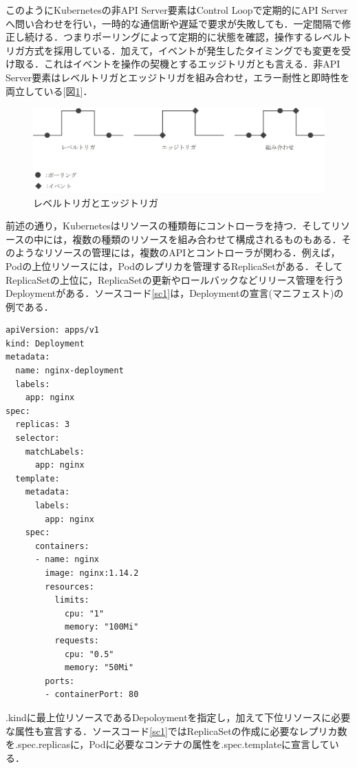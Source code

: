 \documentclass[12pt,a4j]{ujreport}
\begin{document}
このようにKubernetesの非API Server要素はControl Loopで定期的にAPI Serverへ問い合わせを行い，一時的な通信断や遅延で要求が失敗しても．一定間隔で修正し続ける．つまりポーリングによって定期的に状態を確認，操作するレベルトリガ方式を採用している．加えて，イベントが発生したタイミングでも変更を受け取る．これはイベントを操作の契機とするエッジトリガとも言える．非API Server要素はレベルトリガとエッジトリガを組み合わせ，エラー耐性と即時性を両立している[図\ref{fig5}]．

\begin{figure}[b]
    \centerline{\includegraphics[clip,width=140mm]{images/trigger.jpg}}
    \caption{レベルトリガとエッジトリガ}\label{fig5}
\end{figure}

前述の通り，Kubernetesはリソースの種類毎にコントローラを持つ．そしてリソースの中には，複数の種類のリソースを組み合わせて構成されるものもある．そのようなリソースの管理には，複数のAPIとコントローラが関わる．例えば，Podの上位リソースには，Podのレプリカを管理するReplicaSetがある．そしてReplicaSetの上位に，ReplicaSetの更新やロールバックなどリリース管理を行うDeploymentがある．ソースコード\ref{sc1}は，Deploymentの宣言(マニフェスト)の例である．

\newpage
\begin{lstlisting}[caption=Deploymentの宣言例,label=sc1]
apiVersion: apps/v1
kind: Deployment
metadata:
  name: nginx-deployment
  labels:
    app: nginx
spec:
  replicas: 3
  selector:
    matchLabels:
      app: nginx
  template:
    metadata:
      labels:
        app: nginx
    spec:
      containers:
      - name: nginx
        image: nginx:1.14.2
        resources:
          limits:
            cpu: "1"
            memory: "100Mi"
          requests:
            cpu: "0.5"
            memory: "50Mi"
        ports:
        - containerPort: 80
\end{lstlisting}

.kindに最上位リソースであるDepoloymentを指定し，加えて下位リソースに必要な属性も宣言する．ソースコード\ref{sc1}ではReplicaSetの作成に必要なレプリカ数を.spec.replicasに，Podに必要なコンテナの属性を.spec.templateに宣言している．
\end{document}
